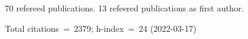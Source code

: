 70 refereed publications. 13 refeered publications as first author.

Total citations~=~2379; h-index~=~24 (2022-03-17)